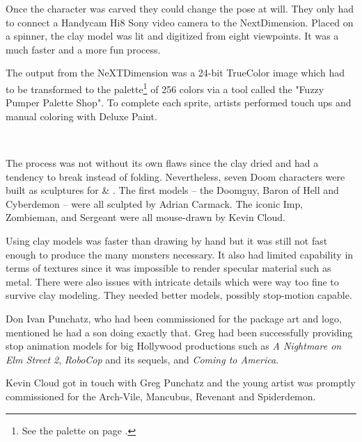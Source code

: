 \vspace{-4mm}
Once the character was carved they could change the pose at will. They only had to connect a Handycam Hi8 Sony video camera to the NextDimension. Placed on a spinner, the clay model was lit and digitized from eight viewpoints. It was a much faster and a more fun process.\par
\vspace{10pt}
The output from the NeXTDimension was a 24-bit TrueColor image which had to be transformed to the \doom{} palette\footnote{See the \doom{} palette on page \pageref{doom_palette}.} of 256 colors via a tool called the "Fuzzy Pumper Palette Shop". To complete each sprite, artists performed touch ups and manual coloring with Deluxe Paint.\\
\par
{}\\
\par
The process was not without its own flaws since the clay dried and had a tendency to break instead of folding. Nevertheless, seven Doom characters were built as sculptures for \doom{} \& \doomii{}. The first models -- the Doomguy, Baron of Hell and Cyberdemon -- were all sculpted by Adrian Carmack. The iconic Imp, Zombieman, and Sergeant were all mouse-drawn by Kevin Cloud.\\
\par
{}

\par





\vspace{-7pt}
Using clay models was faster than drawing by hand but it was still not fast enough to produce the many monsters necessary. It also had limited capability in terms of textures since it was impossible to render specular material such as metal. There were also issues with intricate details which were way too fine to survive clay modeling. They needed better models, possibly stop-motion capable.\\
\par
Don Ivan Punchatz, who had been commissioned for the \doom{} package art and logo, mentioned he had a son doing exactly that. Greg had been successfully providing stop animation models for big Hollywood productions such as \textit{A Nightmare on Elm Street 2}, \textit{RoboCop} and its sequels, and \textit{Coming to America}. \\
\par
Kevin Cloud got in touch with Greg Punchatz and the young artist was promptly commissioned for the Arch-Vile, Mancubus, Revenant and Spiderdemon.\\
\par

